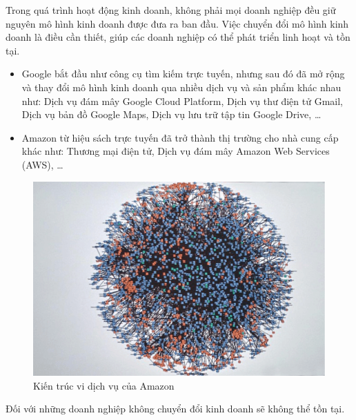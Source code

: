 Trong quá trình hoạt động kinh doanh, không phải mọi doanh nghiệp đều giữ nguyên mô hình kinh doanh được đưa ra ban đầu. Việc chuyển đổi mô hình kinh doanh là điều cần thiết, giúp các doanh nghiệp có thể phát triển linh hoạt và tồn tại.

\begin{example}

\begin{itemize}

\item Google bắt đầu như công cụ tìm kiếm trực tuyến, nhưng sau đó đã mở rộng và thay đổi mô hình kinh doanh qua nhiều dịch vụ và sản phẩm khác nhau như: Dịch vụ đám mây Google Cloud Platform, Dịch vụ thư điện tử Gmail, Dịch vụ bản đồ Google Maps, Dịch vụ lưu trữ tập tin Google Drive, \dots

\item Amazon từ hiệu sách trực tuyến đã trở thành thị trường cho nhà cung cấp khác như: Thương mại điện tử, Dịch vụ đám mây Amazon Web Services (AWS), \dots

\end{itemize}

\end{example}

\begin{figure}[H]

\centering

\includegraphics[scale = 0.5]{pictures/_kien_truc_vi_dich_vu_cua_amazon/main.png}

\caption{Kiến trúc vi dịch vụ của Amazon}

\end{figure}

Đối với những doanh nghiệp không chuyển đổi kinh doanh sẽ không thể tồn tại.

